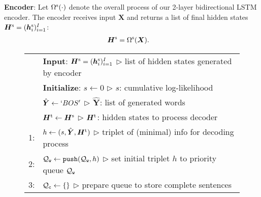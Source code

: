 \documentclass[11pt]{article}
\begin{document}
{\bf Encoder}: Let $\Omega^{\rm s}(\cdot)$ denote the overall process of our 2-layer bidirectional LSTM encoder.
The encoder receives input $\bm{X}$ and returns a list of final hidden states $\bm{H}^{\rm s}=(\bm{h}^{\rm s}_i)^{I}_{i=1}$:
\begin{align}
 \displaystyle
 \bm{H}^{\rm s}
 &=
 \Omega^{\rm s}(\bm{X})
.
 \label{eq:encoder_process}
\end{align}



\begin{figure}[t]
 \centering
 \tabcolsep=1pt
 \small
 \begin{tabular}{rp{71mm}}
  \hline
  \ &\hspace{-1.2em}\textbf{Input}:
  $\bm{H}^{\rm s} = (\bm{h}^{\rm s}_i)^{I}_{i=1}$
  \hspace{\fill} {$\triangleright$ {\scriptsize list of hidden states generated by encoder}}
  \\
  \ &\hspace{-1.2em}\textbf{Initialize}:
      $s \leftarrow 0$
      \hspace{\fill}$\triangleright$ {\scriptsize $s$: cumulative log-likelihood}
      \\
  &\hspace{3.0em}
      $\hat{\bm{Y}} \leftarrow `BOS'$
      \hspace{\fill}$\triangleright$ {\scriptsize $\hat{\bm{Y}}$: list of generated words}
      \\
  &\hspace{3.0em}
      $\bm{H}^{\rm t} \leftarrow \bm{H}^{\rm s}$
      \hspace{\fill}$\triangleright$ {\scriptsize $\bm{H}^{\rm t}$: hidden states to process decoder}
      \\
1:&\hspace{0.0em}
      $h \leftarrow (s, \hat{\bm{Y}}, \bm{H}^{\rm t})$
      \hspace{\fill}$\triangleright$ {\scriptsize triplet of (minimal) info for decoding process}
      \\
  2:&\hspace{0.0em}
      ${\cal Q}_{\tt w} \leftarrow {\tt push}({\cal Q}_{\tt w},h)$
      \hspace{\fill}$\triangleright$ {\scriptsize set initial triplet $h$ to priority queue ${\cal Q}_{\tt w}$}
      \\
  3:&\hspace{0.0em}
      ${\cal Q}_{\tt c} \leftarrow \{\}$
      \hspace{\fill}$\triangleright$ {\scriptsize prepare queue to store complete sentences}

\end{tabular}
\end{figure}
\end{document}
